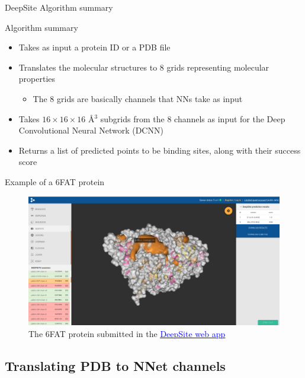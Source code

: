 \documentclass{beamer}
\newcommand{\link}[2]{\href{#1}{\textcolor{blue}{\underline{#2}}}}
\begin{document}
\begin{frame}{DeepSite Algorithm summary}
  \begin{block}{Algorithm summary}
    \begin{itemize}
      \item Takes as input a protein ID or a PDB file
      \item Translates the molecular structures to 8 grids representing molecular properties
      \begin{itemize}
        \item The 8 grids are basically channels that NNs take as input
      \end{itemize}
      \item Takes $16 \times 16 \times 16$ \AA$^3$ subgrids from the 8 channels as input for the Deep Convolutional Neural Network (DCNN)
      \item Returns a list of predicted points to be binding sites, along with their success score
    \end{itemize}
  \end{block}
\end{frame}

\begin{frame}{Example of a 6FAT protein}
  \begin{figure}[h]
    \includegraphics[width=1\textwidth]{deepsite_6fat_result}
    \caption{The 6FAT protein submitted in the \link{https://www.playmolecule.com/deepsite/}{DeepSite web app}}
  \end{figure}
\end{frame}

\subsection{Translating PDB to NNet channels}
\end{document}
